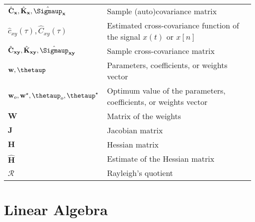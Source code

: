 \documentclass{article}
\begin{document}
\begin{xltabular}{\textwidth}{XX}
    \(\hat{\mathbf{C}}_\mathbf{x}, \hat{\mathbf{K}}_\mathbf{x}, \hat{\boldsymbol{\Sigmaup}}_\mathbf{x}\) & Sample (auto)covariance matrix \\
    \(\hat{c}_{xy}(\tau), \hat{C}_{xy}(\tau)\) & Estimated cross-covariance function of the signal \(x(t)\) or \(x[n]\)\\
    \(\hat{\mathbf{C}}_{\mathbf{xy}}, \hat{\mathbf{K}}_{\mathbf{xy}}, \hat{\boldsymbol{\Sigmaup}}_{\mathbf{xy}}\) & Sample cross-covariance matrix \\
    \(\mathbf{w}, \boldsymbol{\thetaup}\) & Parameters, coefficients, or weights vector \\
    \(\mathbf{w}_o, \mathbf{w}^{\star}, \boldsymbol{\thetaup}_o, \boldsymbol{\thetaup}^{\star}\) & Optimum value of the parameters, coefficients, or weights vector \\
    \(\mathbf{W}\) & Matrix of the weights \\
    \(\mathbf{J}\) & Jacobian matrix\\
    \(\mathbf{H}\) & Hessian matrix \\
    \(\hat{\mathbf{H}}\) & Estimate of the Hessian matrix\\
    \(\mathcal{R}\) & Rayleigh's quotient
\end{xltabular}

\section{Linear Algebra}
\end{document}
